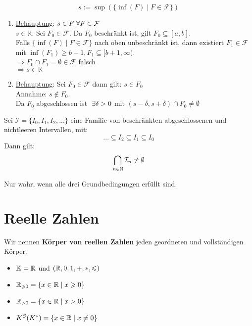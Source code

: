\documentclass[main.tex]{subfiles}
\begin{document}
\begin{Beweis}
  $$s := \sup( \{\inf(F) \mid F \in \mathcal{F}\})$$
  \begin{enumerate}
    \item \underline{Behauptung}: $s \in F \;\forall F \in \mathcal{F}$\\
    $s \in \mathbb{K}$: Sei $F_0 \in \mathcal{F}$. Da $F_0$ beschränkt ist, gilt $F_0 \subseteq[a,b]$.\\
    Falls $\{\inf(F) \mid F \in \mathcal{F}\}$ nach oben unbeschränkt ist, dann existiert $F_1 \in \mathcal{F}$ mit $\inf(F_1)\geq b+1, F_1 \subseteq [b+1,\infty)$.\\
    $\Rightarrow F_0 \cap F_1 = \emptyset \in \mathcal{F}$ falsch\\
    $\Rightarrow s \in \mathbb{K}$
    \item \underline{Behauptung}: Sei $F_0 \in \mathcal{F}$ dann gilt: $s\in F_0$\\
    Annahme: $s \notin F_0$.\\
    Da $F_0$ abgeschlossen ist $\;\exists \delta > 0$ mit $(s-\delta, s+\delta) \cap F_0 \neq \emptyset$
  \end{enumerate}
\end{Beweis}

\begin{Korollar}[Intervallschachtelungsprinzip]
  Sei $\mathcal{I} = \{I_0,I_1,I_2,... \}$ eine Familie von beschränkten abgeschlossenen und nichtleeren Intervallen, mit:
  $$ ... \subseteq I_2 \subseteq I_1 \subseteq I_0$$
  Dann gilt:
  $$\bigcap_{n \in \mathbb{N}} \mathcal{I}_n \neq \emptyset$$
  \begin{Bemerkung}
    Nur wahr, wenn alle drei Grundbedingungen erfüllt sind.
  \end{Bemerkung}
\end{Korollar}



\section{Reelle Zahlen}

\begin{Definition}
  Wir nennen \textbf{Körper von reellen Zahlen} jeden geordneten und vollständigen Körper.\\
  \begin{Bemerkung}[Notation]
    \begin{itemize}
      \item $\mathbb{K} = \mathbb{R}$ und $(\mathbb{R},0,1,+,*,\leqslant)$
      \item $\mathbb{R}_{\geqslant 0} = \{x\in \mathbb{R} \mid x \geqslant 0\}$
      \item $\mathbb{R}_{> 0} = \{x\in \mathbb{R} \mid x > 0\}$
      \item $K^S (K^*) = \{x\in \mathbb{R} \mid x \neq 0\} $
    \end{itemize}
  \end{Bemerkung}
\end{Definition}
\end{document}
